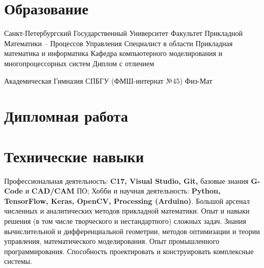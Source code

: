 \documentclass[11pt,a4paper]{moderncv}
\newcommand\Cpp{C\nolinebreak[4]\hspace{-.05em}\raisebox{.4ex}{\relsize{-3}{\textbf{++}}}}
\begin{document}
\maketitle

\section{Образование}

{Санкт-Петербургский Государственный Университет}
{\newline Факультет Прикладной Математики -- Процессов Управления}
{\newline Специалист в области Прикладная математика и информатика}
{\newline Кафедра компьютерного моделирования и многопроцессорных систем}
{Диплом с отличием}  %

{Академическая Гимназия СПБГУ (ФМШ-интернат №45)}
{Физ-Мат}{}{}{}

\section{Дипломная работа}

\section{Технические навыки}
{
  Профессиональная деятельность: \newline
  \textbf{\Cpp17, Visual Studio, Git,} базовые знания \textbf{G-Code} и \textbf{CAD/CAM} ПО;
  \newline
  Хобби и научная деятельность: \newline
  \textbf{Python, TensorFlow, Keras, OpenCV, Processing (Arduino)}.
}
{
  Большой арсенал численных и аналитических методов прикладной математики. Опыт и навыки решения (в том числе творческого и нестандартного) сложных задач. Знания вычислительной и дифференциальной геометрии, методов оптимизации и теории управления, математического моделирования. Опыт промышленного программирования. Способность проектировать и конструировать комплексные системы.
}
\end{document}
